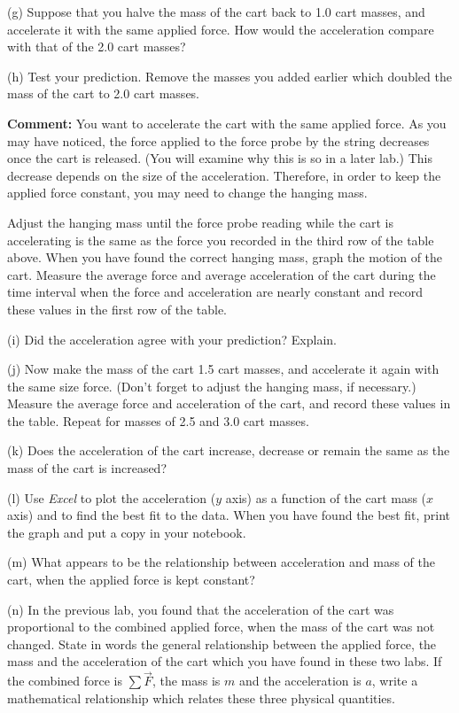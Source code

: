 \pagebreak[2]
(g) Suppose that you halve the mass of the cart back to 1.0 cart masses, and
accelerate it with the same applied force. How would the acceleration compare
with that of the 2.0 cart masses?
\answerspace{20mm}

(h) Test your prediction. Remove the masses you added earlier which doubled
the mass of the cart to 2.0 cart masses. 

\textbf{Comment:} You want to accelerate the cart with the same applied force.
As you may have noticed, the force applied to the force probe by the string
decreases once the cart is released. (You will examine why this is so in a later
lab.) This decrease depends on the size of the acceleration. Therefore, in order
to keep the applied force constant, you may need to change the hanging mass. 

Adjust the hanging mass until the force probe reading while the cart is accelerating
is the same as the force you recorded in the third row of the table above. When
you have found the correct hanging mass, graph the motion of the cart. Measure
the average force and average acceleration of the cart during the time interval
when the force and acceleration are nearly constant and record these values
in the first row of the table.

(i) Did the acceleration agree with your prediction? Explain.
\answerspace{20mm}

(j) Now make the mass of the cart 1.5 cart masses, and accelerate it again with
the same size force. (Don't forget to adjust the hanging mass, if necessary.)
Measure the average force and acceleration of the cart, and record these values
in the table. Repeat for masses of 2.5 and 3.0 cart masses.

(k) Does the acceleration of the cart increase, decrease or remain the same
as the mass of the cart is increased?
\answerspace{10mm}

(l) Use \textit{Excel} to plot the acceleration ($y$ axis) as a function of the
cart mass ($x$ axis) and to find the best fit to the data. When you have found
the best fit, print the graph and put a copy in your notebook. 

(m) What appears to be the relationship between acceleration and mass of the
cart, when the applied force is kept constant?
\answerspace{20mm}

(n) In the previous lab, you found that the acceleration of the cart was proportional
to the combined applied force, when the mass of the cart was not changed. State
in words the general relationship between the applied force, the mass and the
acceleration of the cart which you have found in these two labs. If the combined
force is \( \sum{\vec F}  \), the mass is $m$ and the acceleration is $a$,
write a mathematical relationship which relates these three physical quantities.
\answerspace{20mm}


